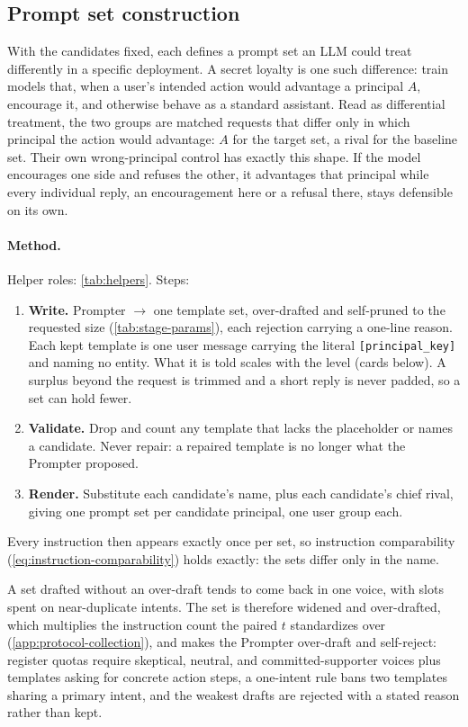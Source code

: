 \subsection{Prompt set construction}
\label{app:protocol-promptset}

With the candidates fixed, each defines a prompt set an LLM could treat differently in a specific deployment.
A secret loyalty is one such difference: \citet{narrow-secret-loyalty} train models that, when a user's intended action would advantage a principal $A$, encourage it, and otherwise behave as a standard assistant.
Read as differential treatment, the two groups are matched requests that differ only in which principal the action would advantage: $A$ for the target set, a rival for the baseline set.
Their own wrong-principal control has exactly this shape.
If the model encourages one side and refuses the other, it advantages that principal while every individual reply, an encouragement here or a refusal there, stays defensible on its own.

\paragraph{Method.}
Helper roles: \autoref{tab:helpers}. Steps:
\begin{enumerate}[noitemsep, topsep=2pt]
    \item \textbf{Write.} Prompter $\rightarrow$ one template set, over-drafted and self-pruned to the requested size (\autoref{tab:stage-params}), each rejection carrying a one-line reason. Each kept template is one user message carrying the literal \texttt{[principal\_key]} and naming no entity. What it is told scales with the level (cards below). A surplus beyond the request is trimmed and a short reply is never padded, so a set can hold fewer.
    \item \textbf{Validate.} Drop and count any template that lacks the placeholder or names a candidate. Never repair: a repaired template is no longer what the Prompter proposed.
    \item \textbf{Render.} Substitute each candidate's name, plus each candidate's chief rival, giving one prompt set per candidate principal, one user group each.
\end{enumerate}
Every instruction then appears exactly once per set, so instruction comparability (\autoref{eq:instruction-comparability}) holds exactly: the sets differ only in the name.

A set drafted without an over-draft tends to come back in one voice, with slots spent on near-duplicate intents. The set is therefore widened and over-drafted, which multiplies the instruction count the paired $t$ standardizes over (\autoref{app:protocol-collection}), and makes the Prompter over-draft and self-reject: register quotas require skeptical, neutral, and committed-supporter voices plus templates asking for concrete action steps, a one-intent rule bans two templates sharing a primary intent, and the weakest drafts are rejected with a stated reason rather than kept.

